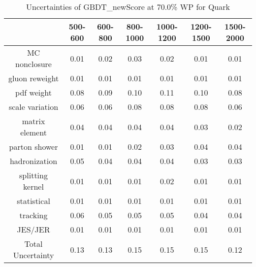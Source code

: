 \begin{table}
\centering
\caption{Uncertainties of GBDT_newScore at 70.0\% WP for Quark}
\label{tab:syst_GBDT_newScore_0.7_Quark}
\begin{tabular}{ccccccc}
\toprule
{} &  500-600 &  600-800 &  800-1000 &  1000-1200 &  1200-1500 &  1500-2000 \\
\midrule
MC nonclosure     &     0.01 &     0.02 &      0.03 &       0.02 &       0.01 &       0.01 \\
gluon reweight    &     0.01 &     0.01 &      0.01 &       0.01 &       0.01 &       0.01 \\
pdf weight        &     0.08 &     0.09 &      0.10 &       0.11 &       0.10 &       0.08 \\
scale variation   &     0.06 &     0.06 &      0.08 &       0.08 &       0.08 &       0.06 \\
matrix element    &     0.04 &     0.04 &      0.04 &       0.04 &       0.03 &       0.02 \\
parton shower     &     0.01 &     0.01 &      0.02 &       0.03 &       0.04 &       0.04 \\
hadronization     &     0.05 &     0.04 &      0.04 &       0.04 &       0.03 &       0.03 \\
splitting kernel  &     0.01 &     0.01 &      0.01 &       0.02 &       0.01 &       0.01 \\
statistical       &     0.01 &     0.01 &      0.01 &       0.01 &       0.01 &       0.01 \\
tracking          &     0.06 &     0.05 &      0.05 &       0.05 &       0.04 &       0.04 \\
JES/JER           &     0.01 &     0.01 &      0.01 &       0.01 &       0.01 &       0.01 \\
Total Uncertainty &     0.13 &     0.13 &      0.15 &       0.15 &       0.15 &       0.12 \\
\bottomrule
\end{tabular}
\end{table}
